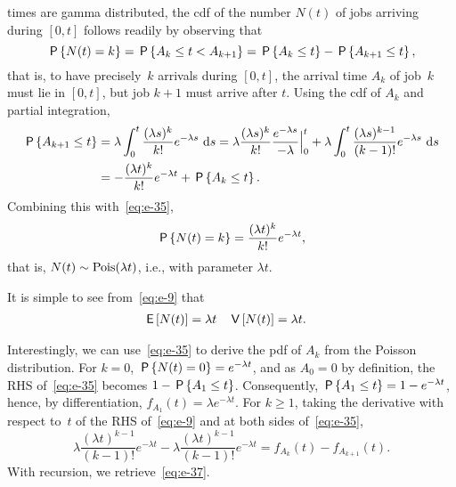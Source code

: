 \documentclass[stochastic-or.tex]{subfiles}
\begin{document}
 times are gamma distributed,  the cdf of the number $N(t)$ of jobs arriving during $[0, t]$ follows readily by observing that
\begin{equation}\label{eq:e-35}
\P{N(t) = k} = \P{A_{k} \leq t < A_{k+1}} = \P{A_k \leq t} - \P{A_{k+1} \leq t},
\end{equation}
that is, to have precisely~$k$ arrivals during $[0, t]$, the arrival time $A_{k}$ of job~$k$ must lie in $[0, t]$, but job $k+1$ must arrive after $t$.
Using the cdf of $A_{k}$ and partial integration,
\begin{align*}
\P{A_{k+1} \leq t}
&= \lambda \int_0^t \frac{(\lambda s)^{k}}{k!}e^{-\lambda s}\, \d s
= \lambda \frac{(\lambda s)^{k}}{k!}\frac{e^{-\lambda s}}{-\lambda} \Big|_{0}^t + \lambda \int_0^t \frac{(\lambda s)^{k-1}}{(k-1)!}e^{-\lambda s}\, \d s \\
&= - \frac{(\lambda t)^{k}}{k!} e^{-\lambda t} + \P{A_k \leq t}.
\end{align*}
Combining this with~\cref{eq:e-35},
\begin{equation}\label{eq:e-9}
\P{N(t) = k} = \frac{(\lambda t)^{k}}{k!} e^{-\lambda t},
\end{equation}
that is, $N(t) \sim \Pois{\lambda t}$, i.e.,  with parameter $\lambda t$.



It is simple to see from~\cref{eq:e-9} that
\begin{align*}
\E{N(t)} &= \lambda t
& \V{N(t)} &= \lambda t.
\end{align*}



Interestingly, we can use~\cref{eq:e-35} to derive the pdf of $A_{k}$ from the Poisson distribution.
For $k=0$, $\P{N(t) = 0} = e^{-\lambda t}$, and as $A_0=0$ by definition, the RHS of~\cref{eq:e-35} becomes $1-\P{A_1\leq t}$.
Consequently, $\P{A_{1}\leq t} = 1 - e^{-\lambda t}$, hence, by differentiation,  $f_{A_1}(t) = \lambda e^{-\lambda t}$.
For $k\geq 1$, taking the derivative with respect to~$t$ of the RHS of~\cref{eq:e-9} and at both sides of~\cref{eq:e-35},
\begin{equation*}
\lambda \frac{(\lambda t)^{k-1}}{(k-1)!} e^{-\lambda t} - \lambda \frac{(\lambda t)^{k-1}}{(k-1)!} e^{-\lambda t} = f_{A_{k}}(t) - f_{A_{k+1}}(t).
\end{equation*}
With recursion, we retrieve~\cref{eq:e-37}.
\end{document}
